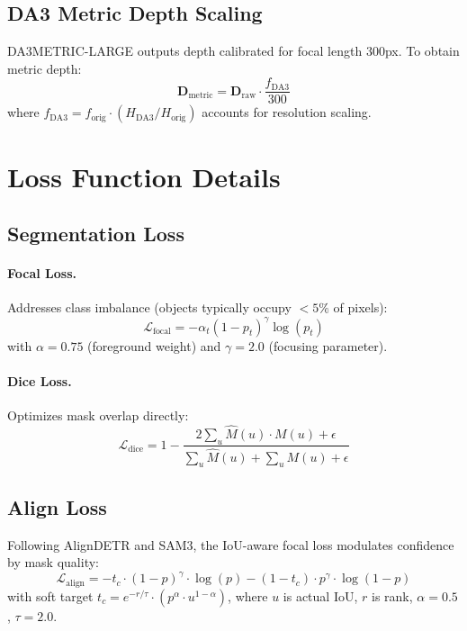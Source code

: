 \subsection{DA3 Metric Depth Scaling}

DA3METRIC-LARGE outputs depth calibrated for focal length 300px. To obtain metric depth:
\begin{equation}
\mathbf{D}_{\text{metric}} = \mathbf{D}_{\text{raw}} \cdot \frac{f_{\text{DA3}}}{300}
\end{equation}
where $f_{\text{DA3}} = f_{\text{orig}} \cdot (H_{\text{DA3}} / H_{\text{orig}})$ accounts for resolution scaling.

\section{Loss Function Details}
\label{app:loss}

\subsection{Segmentation Loss}

\paragraph{Focal Loss.}
Addresses class imbalance (objects typically occupy $<5\%$ of pixels):
\begin{equation}
\mathcal{L}_{\text{focal}} = -\alpha_t (1 - p_t)^\gamma \log(p_t)
\end{equation}
with $\alpha=0.75$ (foreground weight) and $\gamma=2.0$ (focusing parameter).

\paragraph{Dice Loss.}
Optimizes mask overlap directly:
\begin{equation}
\mathcal{L}_{\text{dice}} = 1 - \frac{2 \sum_u \hat{M}(u) \cdot M(u) + \epsilon}{\sum_u \hat{M}(u) + \sum_u M(u) + \epsilon}
\end{equation}

\subsection{Align Loss}

Following AlignDETR and SAM3, the IoU-aware focal loss modulates confidence by mask quality:
\begin{equation}
\mathcal{L}_{\text{align}} = -t_c \cdot (1-p)^\gamma \cdot \log(p) - (1-t_c) \cdot p^\gamma \cdot \log(1-p)
\end{equation}
with soft target $t_c = e^{-r/\tau} \cdot (p^\alpha \cdot u^{1-\alpha})$, where $u$ is actual IoU, $r$ is rank, $\alpha=0.5$, $\tau=2.0$.

